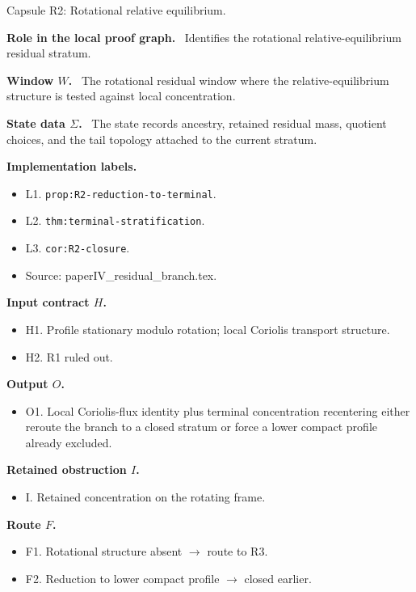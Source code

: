 \documentclass[11pt]{amsart}
\newcommand{\capsulefield}[1]{\par\smallskip\noindent\textbf{#1.}\ }
\begin{document}
\begin{proofcapsule}{Capsule R2: Rotational relative equilibrium.}
  \capsulefield{Role in the local proof graph}
  Identifies the rotational relative-equilibrium residual stratum.

  \capsulefield{Window \(W\)}
The rotational residual window where the relative-equilibrium structure is tested against local concentration.

  \capsulefield{State data \(\Sigma\)}
The state records ancestry, retained residual mass, quotient choices, and the tail topology attached to the current stratum.

  \capsulefield{Implementation labels}
  \begin{itemize}[leftmargin=1.8em]
  \item L1. \texttt{prop:R2-reduction-to-terminal}.
  \item L2. \texttt{thm:terminal-stratification}.
  \item L3. \texttt{cor:R2-closure}.
  \item Source: paperIV\_residual\_branch.tex.
  \end{itemize}

  \capsulefield{Input contract \(H\)}
  \begin{itemize}[leftmargin=1.8em]
  \item H1. Profile stationary modulo rotation; local Coriolis transport structure.
  \item H2. R1 ruled out.
  \end{itemize}

  \capsulefield{Output \(O\)}
  \begin{itemize}[leftmargin=1.8em]
  \item O1. Local Coriolis-flux identity plus terminal concentration recentering either reroute the branch to a closed stratum or force a lower compact profile already excluded.
  \end{itemize}

  \capsulefield{Retained obstruction \(I\)}
  \begin{itemize}[leftmargin=1.8em]
  \item I. Retained concentration on the rotating frame.
  \end{itemize}

  \capsulefield{Route \(F\)}
  \begin{itemize}[leftmargin=1.8em]
  \item F1. Rotational structure absent $\to$ route to R3.
  \item F2. Reduction to lower compact profile $\to$ closed earlier.
  \end{itemize}


\end{proofcapsule}
\end{document}
